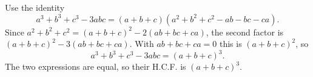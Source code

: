 Use the identity
\[
a^3+b^3+c^3-3abc=(a+b+c)\left(a^2+b^2+c^2-ab-bc-ca\right).
\]
Since $a^2+b^2+c^2=(a+b+c)^2-2(ab+bc+ca)$, the second factor is $(a+b+c)^2-3(ab+bc+ca)$. With $ab+bc+ca=0$ this is $(a+b+c)^2$, so
\[
a^3+b^3+c^3-3abc=(a+b+c)^3 .
\]
The two expressions are equal, so their H.C.F. is $\boxed{(a+b+c)^3}$.
